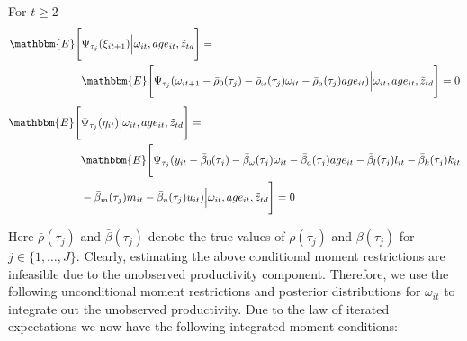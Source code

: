 \documentclass{article}
\begin{document}
\noindent For $t\geq 2$
\begin{equation}\label{omegamoment}
\begin{split}
\mathbbm{E}\Bigg[&\Psi_{\tau_{j}}(\xi_{it+1})\Big|\omega_{it}, age_{it}, \tilde{z}_{td}\Bigg]=\\
&\mathbbm{E}\Bigg[\Psi_{\tau_{j}}(\omega_{it+1}-\bar{\rho}_{0}(\tau_{j})-\bar{\rho}_{\omega}(\tau_{j})\omega_{it}-\bar{\rho}_{a}(\tau_{j})age_{it})\Big|\omega_{it}, age_{it}, \tilde{z}_{td}\Bigg]=0
\end{split}
\end{equation}
\begin{equation}\label{ymoment}
\begin{split}
\mathbbm{E}\Bigg[&\Psi_{\tau_{j}}(\eta_{it})\Big|\omega_{it}, age_{it}, \tilde{z}_{td}\Bigg]=\\
&\mathbbm{E}\Bigg[\Psi_{\tau_{j}}(y_{it}-\bar{\beta}_{0}(\tau_{j})-\bar{\beta}_{\omega}(\tau_{j})\omega_{it}-\bar{\beta}_{a}(\tau_{j})age_{it}-\bar{\beta}_{l}(\tau_{j})l_{it}-\bar{\beta}_{k}(\tau_{j})k_{it}\\
&-\bar{\beta}_{m}(\tau_{j})m_{it}-\bar{\beta}_{u}(\tau_{j})u_{it})\Big|\omega_{it}, age_{it}, \tilde{z}_{td}\Bigg]=0
\end{split}
\end{equation}

Here $\bar{\rho}(\tau_{j})$ and $\bar{\beta}(\tau_{j})$ denote the true values of $\rho(\tau_{j})$ and $\beta(\tau_{j})$ for $j\in\{1,\dots, J\}$. Clearly, estimating the above conditional moment restrictions are infeasible due to the unobserved productivity component. Therefore, we use the following unconditional moment restrictions and posterior distributions for $\omega_{it}$ to integrate out the unobserved productivity. Due to the law of iterated expectations we now have the following integrated moment conditions:
\end{document}
